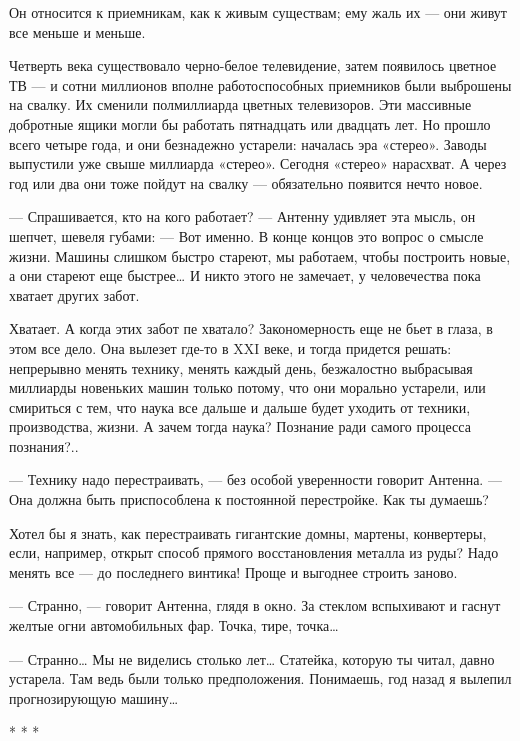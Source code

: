    Он относится к приемникам, как к живым существам; ему жаль их — они  живут
   все меньше и меньше.

   Четверть  века  существовало  черно-белое  телевидение,  затем   появилось
   цветное ТВ  — и  сотни миллионов  вполне работоспособных  приемников  были
   выброшены на  свалку. Их  сменили  полмиллиарда цветных  телевизоров.  Эти
   массивные добротные ящики могли бы  работать пятнадцать или двадцать  лет.
   Но прошло  всего четыре  года,  и они  безнадежно устарели:  началась  эра
   «стерео». Заводы выпустили уже свыше миллиарда «стерео». Сегодня  «стерео»
   нарасхват. А через  год или два  они тоже пойдут  на свалку —  обязательно
   появится нечто новое.

   — Спрашивается, кто  на кого работает?  — Антенну удивляет  эта мысль,  он
   шепчет, шевеля губами: —  Вот именно. В конце  концов это вопрос о  смысле
   жизни. Машины слишком быстро стареют, мы работаем, чтобы построить  новые,
   а они стареют еще быстрее… И никто этого не замечает, у человечества  пока
   хватает других забот.

   Хватает. А  когда этих  забот пе  хватало? Закономерность  еще не  бьет  в
   глаза, в этом все дело.  Она вылезет где-то в  XXI веке, и тогда  придется
   решать:  непрерывно  менять  технику,  менять  каждый  день,   безжалостно
   выбрасывая миллиарды  новеньких  машин  только потому,  что  они  морально
   устарели, или смириться с тем, что наука все дальше и дальше будет уходить
   от техники, производства, жизни. А зачем тогда наука? Познание ради самого
   процесса познания?..

   — Технику надо перестраивать, — без особой уверенности говорит Антенна.  —
   Она должна быть приспособлена к постоянной перестройке. Как ты думаешь?

   Хотел бы я знать, как перестраивать гигантские домны, мартены, конвертеры,
   если, например, открыт способ прямого восстановления металла из руды? Надо
   менять все — до последнего винтика! Проще и выгоднее строить заново.

   — Странно, — говорит Антенна, глядя в окно. За стеклом вспыхивают и гаснут
   желтые огни автомобильных фар. Точка, тире, точка…

   — Странно… Мы не виделись столько  лет… Статейка, которую ты читал,  давно
   устарела. Там  ведь  были только  предположения.  Понимаешь, год  назад  я
   вылепил прогнозирующую машину…

                                     * * *

